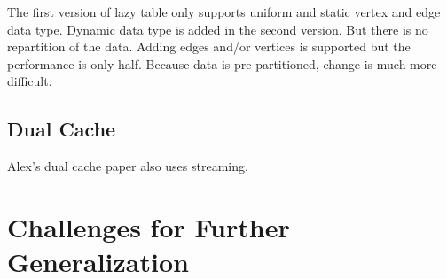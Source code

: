 \documentclass[10pt, twocolumn, a4paper]{article}
\begin{document}
The first version of lazy table only supports uniform and static vertex and edge data type. Dynamic data type is added in the second version. But there is no repartition of the data. Adding edges and/or vertices is supported but the performance is only half. Because data is pre-partitioned, change is much more difficult.

\subsection{Dual Cache}

Alex's dual cache paper also uses streaming.

\section{Challenges for Further Generalization}
\label{sec:generalize}
\end{document}
